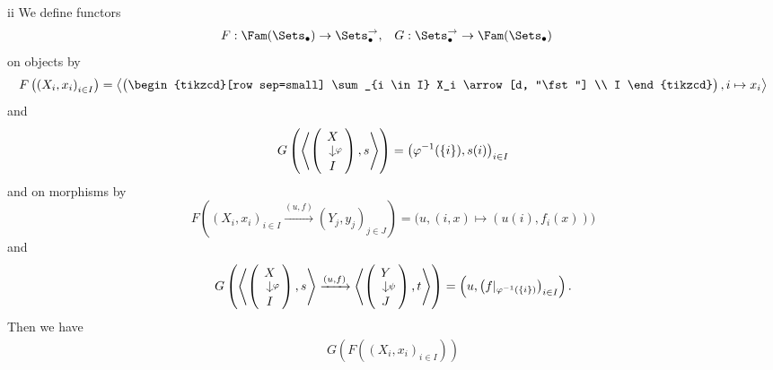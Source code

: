\begin{partsolution}{ii}
We define functors
\begin{align*}
F &: \Fam(\Sets_{\bullet}) \to \Sets_{\bullet}^{\rightarrow}, &
G &: \Sets_{\bullet}^{\rightarrow} \to \Fam(\Sets_{\bullet})
\end{align*}
on objects by
\begin{equation*}
F\left(\left(X_i, x_i\right)_{i \in I}\right)
= \left\langle\begin{pmatrix}
\begin{tikzcd}[row sep=small]
\sum_{i \in I} X_i \arrow[d, "\fst"] \\ I
\end{tikzcd}
\end{pmatrix}, i \mapsto x_i\right\rangle
\end{equation*}
and
\begin{equation*}
G\left(\left\langle
\begin{pmatrix}
\begin{tikzcd}[row sep=small]
X \arrow[d, "\varphi"] \\ I
\end{tikzcd}
\end{pmatrix}, s
\right\rangle\right)
= \left(\varphi^{-1}(\{i\}), s(i)\right)_{i \in I}
\end{equation*}
and on morphisms by
\begin{equation*}
F\left(\left(X_i, x_i\right)_{i \in I} \xrightarrow{(u, f)} \left(Y_j, y_j\right)_{j \in J}\right)
= \big(u, (i, x) \mapsto (u(i), f_i(x))\big)
\end{equation*}
and
\begin{equation*}
G\left(
\left\langle
\begin{pmatrix}
\begin{tikzcd}[row sep=small]
X \arrow[d, "\varphi"] \\ I
\end{tikzcd}
\end{pmatrix}, s
\right\rangle
\xrightarrow{(u, f)}
\left\langle
\begin{pmatrix}
\begin{tikzcd}[row sep=small]
Y \arrow[d, "\psi"] \\ J
\end{tikzcd}
\end{pmatrix}, t
\right\rangle
\right)
= \left(u, \left(f|_{\varphi^{-1}(\{i\})}\right)_{i \in I}\right).
\end{equation*}
Then we have
\begin{align*}
G\left(F\left(\left(X_i, x_i\right)_{i \in I}\right)\right)

\end{align*}
\end{partsolution}
